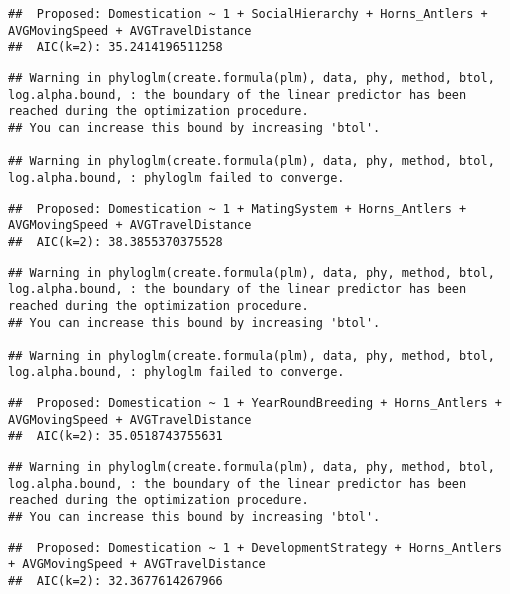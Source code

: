 \documentclass[
]{article}
\begin{document}
\begin{verbatim}
##  Proposed: Domestication ~ 1 + SocialHierarchy + Horns_Antlers + AVGMovingSpeed + AVGTravelDistance
##  AIC(k=2): 35.2414196511258
\end{verbatim}

\begin{verbatim}
## Warning in phyloglm(create.formula(plm), data, phy, method, btol, log.alpha.bound, : the boundary of the linear predictor has been reached during the optimization procedure.
## You can increase this bound by increasing 'btol'.

## Warning in phyloglm(create.formula(plm), data, phy, method, btol, log.alpha.bound, : phyloglm failed to converge.
\end{verbatim}

\begin{verbatim}
##  Proposed: Domestication ~ 1 + MatingSystem + Horns_Antlers + AVGMovingSpeed + AVGTravelDistance
##  AIC(k=2): 38.3855370375528
\end{verbatim}

\begin{verbatim}
## Warning in phyloglm(create.formula(plm), data, phy, method, btol, log.alpha.bound, : the boundary of the linear predictor has been reached during the optimization procedure.
## You can increase this bound by increasing 'btol'.

## Warning in phyloglm(create.formula(plm), data, phy, method, btol, log.alpha.bound, : phyloglm failed to converge.
\end{verbatim}

\begin{verbatim}
##  Proposed: Domestication ~ 1 + YearRoundBreeding + Horns_Antlers + AVGMovingSpeed + AVGTravelDistance
##  AIC(k=2): 35.0518743755631
\end{verbatim}

\begin{verbatim}
## Warning in phyloglm(create.formula(plm), data, phy, method, btol, log.alpha.bound, : the boundary of the linear predictor has been reached during the optimization procedure.
## You can increase this bound by increasing 'btol'.
\end{verbatim}

\begin{verbatim}
##  Proposed: Domestication ~ 1 + DevelopmentStrategy + Horns_Antlers + AVGMovingSpeed + AVGTravelDistance
##  AIC(k=2): 32.3677614267966
\end{verbatim}
\end{document}

